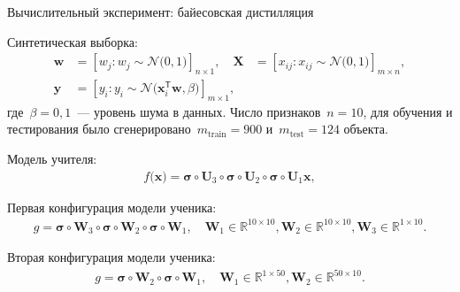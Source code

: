 \documentclass[10pt,pdf,hyperref={unicode}]{beamer}
\begin{document}
\begin{frame}{Вычислительный эксперимент: байесовская дистилляция}

Синтетическая выборка:
\[
\label{eq:ex:1}
\begin{aligned}
\mathbf{w} &= \left[w_j: w_{j}\sim \mathcal{N}\bigr(0, 1\bigr)\right]_{n\times 1}, \quad \mathbf{X} &= \left[x_{ij}: x_{ij}\sim\mathcal{N}\bigr(0, 1\bigr)\right]_{m\times n}, \\
 \mathbf{y} &= \left[y_i: y_i \sim \mathcal{N}\bigr(\mathbf{x}_i^{\mathsf{T}}\mathbf{w}, \beta\bigr)\right]_{m \times 1},
\end{aligned}
\]
где~$\beta=0{,}1$~--- уровень шума в данных. Число признаков~$n=10$, для обучения и тестирования было сгенерировано~$m_{\text{train}}=900$ и~$m_{\text{test}}=124$ объекта.

Модель учителя:
\[
\begin{aligned}
f\bigr(\mathbf{x}\bigr) = \bm{\sigma} \circ \mathbf{U}_3\circ \bm{\sigma} \circ \mathbf{U}_2\circ\bm{\sigma}\circ \mathbf{U}_1\mathbf{x},
\end{aligned}
\]

Первая конфигурация модели ученика:
\[
\begin{aligned}
g = \bm{\sigma} \circ \mathbf{W}_3 \circ \bm{\sigma} \circ \mathbf{W}_2 \circ \bm{\sigma} \circ \mathbf{W}_1, \quad \mathbf{W}_{1} \in \mathbb{R}^{10 \times 10}, \mathbf{W}_{2} \in \mathbb{R}^{10 \times 10},  \mathbf{W}_{3} \in \mathbb{R}^{1 \times 10}.
\end{aligned}
\]

Вторая конфигурация модели ученика:
\[
\begin{aligned}
g = \bm{\sigma} \circ \mathbf{W}_2 \circ \bm{\sigma} \circ \mathbf{W}_1, \quad \mathbf{W}_{1} \in \mathbb{R}^{1 \times 50}, \mathbf{W}_{2} \in \mathbb{R}^{50 \times 10}.
\end{aligned}
\]
\end{frame}
\end{document}
